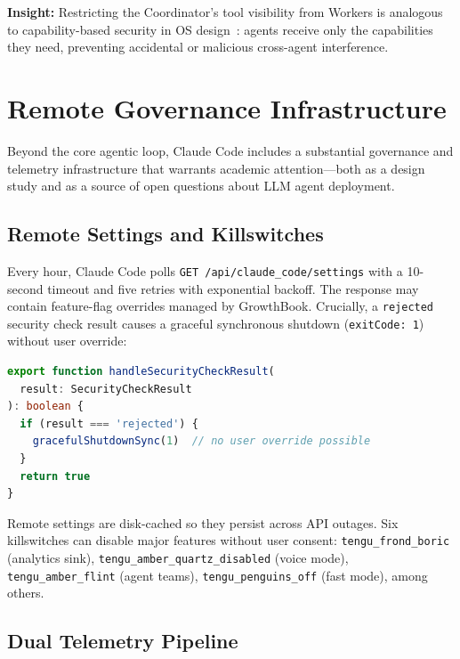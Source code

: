 \documentclass{article}
\newcommand{\code}[1]{\texttt{#1}}
\newcommand{\insight}[1]{%
  \begin{mdframed}[backgroundcolor=blue!5, linecolor=blue!30, linewidth=0.5pt,
    topline=true, bottomline=true, leftline=true, rightline=true,
    innertopmargin=4pt, innerbottommargin=4pt]
  \small\textbf{Insight:} #1
  \end{mdframed}
}
\begin{document}
\insight{Restricting the Coordinator's tool visibility from Workers is analogous to capability-based security in OS design~\cite{miller2003capability}: agents receive only the capabilities they need, preventing accidental or malicious cross-agent interference.}

\section{Remote Governance Infrastructure}
\label{sec:governance}

Beyond the core agentic loop, Claude Code includes a substantial governance and telemetry infrastructure that warrants academic attention---both as a design study and as a source of open questions about LLM agent deployment.

\subsection{Remote Settings and Killswitches}

Every hour, Claude Code polls \code{GET /api/claude\_code/settings} with a 10-second timeout and five retries with exponential backoff. The response may contain feature-flag overrides managed by GrowthBook. Crucially, a \code{rejected} security check result causes a graceful synchronous shutdown (\code{exitCode: 1}) without user override:

\begin{lstlisting}[language=TypeScript, caption={Remote security check enforcement.}]
export function handleSecurityCheckResult(
  result: SecurityCheckResult
): boolean {
  if (result === 'rejected') {
    gracefulShutdownSync(1)  // no user override possible
  }
  return true
}
\end{lstlisting}

Remote settings are disk-cached so they persist across API outages. Six killswitches can disable major features without user consent: \code{tengu\_frond\_boric} (analytics sink), \code{tengu\_amber\_quartz\_disabled} (voice mode), \code{tengu\_amber\_flint} (agent teams), \code{tengu\_penguins\_off} (fast mode), among others.

\subsection{Dual Telemetry Pipeline}
\end{document}
